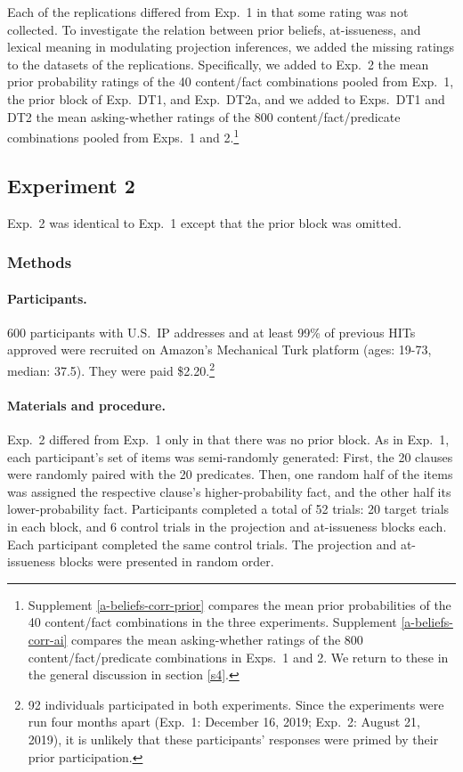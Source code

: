 \documentclass[11pt,fleqn]{article}
\newcommand{\6}{\mbox{$[\hspace*{-.6mm}[$}}
\newcommand{\9}{\mbox{$]\hspace*{-.6mm}]$}}
\begin{document}
Each of the replications differed from Exp.~1 in that some rating was not collected. To investigate the relation between prior beliefs, at-issueness, and lexical meaning in modulating projection inferences, we added the missing ratings to the datasets of the replications. Specifically, we added to Exp.~2 the mean prior probability ratings of the 40 content/fact combinations pooled from Exp.~1, the prior block of Exp.~DT1, and Exp.~DT2a, and we added to Exps.~DT1 and DT2 the mean asking-whether ratings of the 800 content/fact/predicate combinations pooled from Exps.~1 and 2.\footnote{Supplement \ref{a-beliefs-corr-prior} compares the mean prior probabilities of the 40 content/fact combinations in the three experiments. Supplement \ref{a-beliefs-corr-ai} compares the mean asking-whether ratings of the 800 content/fact/predicate combinations in Exps.~1 and 2. We return to these in the general discussion in section \ref{s4}.}


\subsection{Experiment 2}\label{s:exp2}

Exp.~2 was identical to Exp.~1 except that the prior block was omitted.

\subsubsection{Methods}

\paragraph{Participants.} 600 participants with U.S.\ IP addresses and at least 99\% of previous HITs approved were recruited on Amazon's Mechanical Turk platform (ages: 19-73, median: 37.5). They were paid \$2.20.\footnote{92 individuals participated in both experiments. Since the experiments were run four months apart (Exp.~1: December 16, 2019; Exp.~2: August 21, 2019), it is unlikely that these participants' responses were primed by their prior participation.}

\paragraph{Materials and procedure.}  Exp.~2 differed from Exp.~1 only in that there was no prior block. As in Exp.~1, each participant's set of items was semi-randomly generated: First, the 20 clauses were randomly paired with the 20 predicates. Then, one random half of the items was assigned the respective clause's higher-probability fact, and the other half its lower-probability fact. Participants completed a total of 52 trials: 20 target trials in each block, and 6 control trials in the projection and at-issueness blocks each. Each participant completed the same control trials. The projection and at-issueness blocks were presented in random order. 
\end{document}
